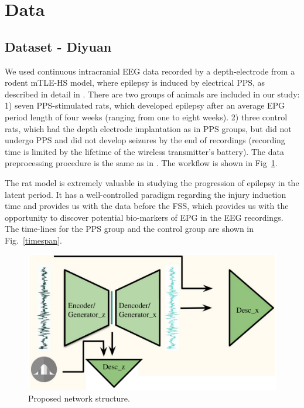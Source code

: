 \documentclass[pmlr]{jmlr}%
\begin{document}
\section{Data}
\subsection{Dataset - Diyuan}\label{dataset}

We used continuous intracranial EEG data recorded by a depth-electrode from a rodent mTLE-HS model, where epilepsy is induced by electrical PPS, as described in detail in \cite{costard2019electrical}. There are two groups of animals are included in our study: 1) seven PPS-stimulated rats, which developed epilepsy after an average EPG period length of four weeks (ranging from one to eight weeks). 2) three control rats, which had the depth electrode implantation as in PPS groups, but did not undergo PPS and did not develop seizures by the end of recordings (recording time is limited by the lifetime of the wireless transmitter's battery). The data preprocessing procedure is the same as in \cite{lu2020towards}. The workflow is shown in Fig~\ref{workflow}. 

The rat model is extremely valuable in studying the progression of epilepsy in the latent period. It has a well-controlled paradigm regarding  the injury induction time and provides us with the data before the FSS, which provides us with the opportunity to discover potential bio-markers of EPG in the EEG recordings. The time-lines for the PPS group and the control group are shown in Fig.~\ref{timespan}. 



\begin{figure}[tb]
	\centering
	\includegraphics[width=0.9\linewidth]{figures/network_structure.pdf}
	\caption{Proposed network structure.}
	\label{workflow}
\end{figure}
\label{model}
\end{document}
